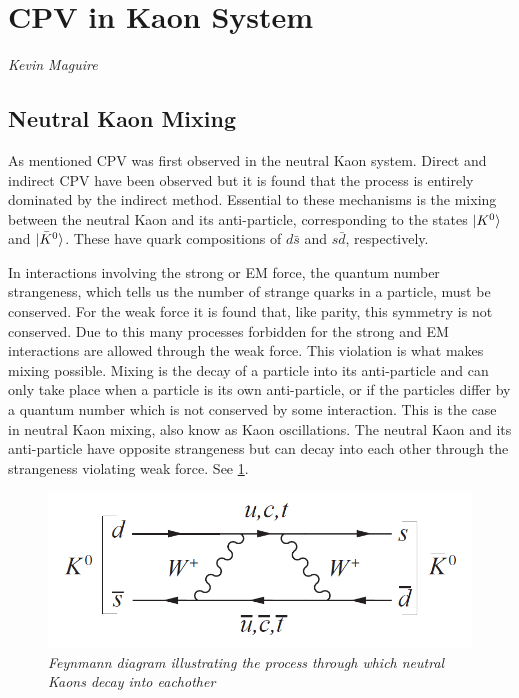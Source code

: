 \section{CPV in Kaon System} 
\vspace{-1.0em}
\begin{center}
\tiny{\textit{Kevin Maguire}}
\end{center}

\subsection{Neutral Kaon Mixing}

As mentioned CPV was first observed in the neutral Kaon system. Direct and indirect CPV have been observed but it is found that the process is entirely dominated by the indirect method. Essential to these mechanisms is the mixing between the neutral Kaon and its anti-particle, corresponding to the states $\ket{K^{0}}$ and $\ket{\bar{K}^{0}}$. These have quark compositions of $d \bar{s}$ and $s \bar{d}$, respectively. 

In interactions involving the strong or EM force, the quantum number strangeness, which tells us the number of strange quarks in a particle, must be conserved. For the weak force it is found that, like parity, this symmetry is not conserved. Due to this many processes forbidden for the strong and EM interactions are allowed through the weak force. This violation is what makes mixing possible. Mixing is the decay of a particle into its anti-particle and can only take place when a particle is its own anti-particle, or if the particles differ by a quantum number which is not conserved by some interaction. This is the case in neutral Kaon mixing, also know as Kaon oscillations. The neutral Kaon and its anti-particle have opposite strangeness but can decay into each other through the strangeness violating weak force. See \cref{KaonMixinFeyn}. 

\begin{figure}[h!]
\begin{center}
\includegraphics[scale=0.4]{figs/KevFeyn1.png}
\end{center}
\caption{\textit{Feynmann diagram illustrating the process through which neutral Kaons decay into eachother}}
\label{KaonMixinFeyn}
\end{figure}

